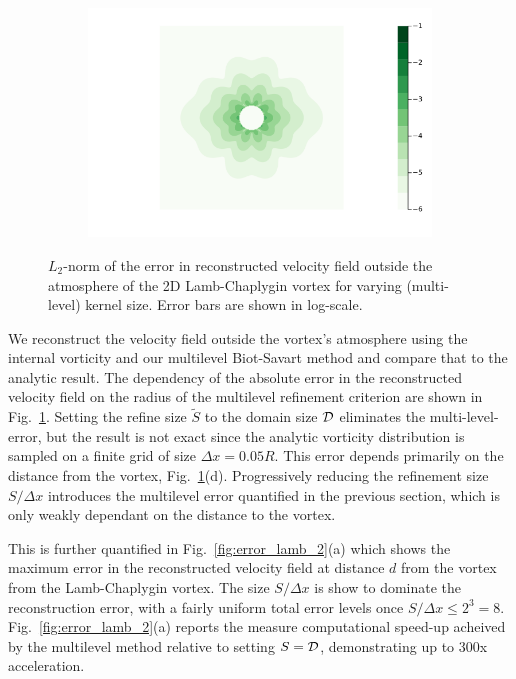 \documentclass{article}
\begin{document}
\begin{figure}
\begin{subfigure}{.5\textwidth}
  \caption{}
\end{subfigure}%
\begin{subfigure}{.5\textwidth}
  \centering
  \includegraphics[width=\linewidth]{tex/fig/lamb_dipole_error_dist128.png}
  \caption{}
\end{subfigure}
\caption{$L_2$-norm of the error in reconstructed velocity field outside the atmosphere of the 2D Lamb-Chaplygin vortex for varying (multi-level) kernel size. Error bars are shown in log-scale.}
\label{fig:lam_error_dist}
\end{figure}

We reconstruct the velocity field outside the vortex's atmosphere using the internal vorticity and our multilevel Biot-Savart method and compare that to the analytic result. The dependency of the absolute error in the reconstructed velocity field on the radius of the multilevel refinement criterion are shown in Fig.~\ref{fig:lam_error_dist}. Setting the refine size $\tilde{S}$ to the domain size $\cal D$ eliminates the multi-level-error, but the result is not exact since the analytic vorticity distribution is sampled on a finite grid of size $\Delta x=0.05
R$. This error depends primarily on the distance from the vortex, Fig.~\ref{fig:lam_error_dist}(d). Progressively reducing the refinement size $S/\Delta x$ introduces the multilevel error quantified in the previous section, which is only weakly dependant on the distance to the vortex.

This is further quantified in Fig.~\ref{fig:error_lamb_2}(a) which shows the maximum error in the reconstructed velocity field at distance $d$ from the vortex from the Lamb-Chaplygin vortex. The size $S/\Delta x$ is show to dominate the reconstruction error, with a fairly uniform total error levels once $S/\Delta x \le 2^3 = 8$. Fig.~\ref{fig:error_lamb_2}(a) reports the measure computational speed-up acheived by the multilevel method relative to setting $S=\cal D$, demonstrating up to 300x acceleration.
\end{document}
